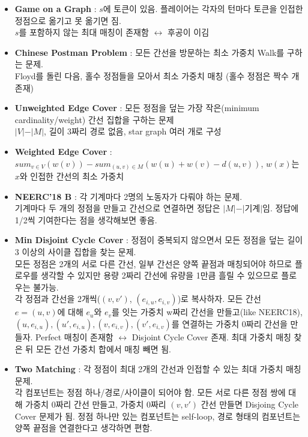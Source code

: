 \documentclass[landscape, 8pt, a4paper, oneside]{extarticle} %
\begin{document}
\begin{multicols*}{3}
\begin{itemize}
    \setlength\itemsep{0.1em}
    \item \textbf{Game on a Graph} : $s$에 토큰이 있음. 플레이어는 각자의 턴마다 토큰을 인접한 정점으로 옮기고 못 옮기면 짐.\\
    $s$를 포함하지 않는 최대 매칭이 존재함 $\leftrightarrow$ 후공이 이김
    \item \textbf{Chinese Postman Problem} : 모든 간선을 방문하는 최소 가중치 Walk를 구하는 문제.\\
    Floyd를 돌린 다음, 홀수 정점들을 모아서 최소 가중치 매칭 (홀수 정점은 짝수 개 존재)
    \item \textbf{Unweighted Edge Cover} : 모든 정점을 덮는 가장 작은(minimum cardinality/weight) 간선 집합을 구하는 문제\\
    $\vert V\vert - \vert M\vert$, 길이 3짜리 경로 없음, star graph 여러 개로 구성
    \item \textbf{Weighted Edge Cover} : $sum_{v \in V}(w(v)) - sum_{(u,v) \in M}(w(u) + w(v) - d(u,v))$, $w(x)$는 $x$와 인접한 간선의 최소 가중치
    \item \textbf{NEERC'18 B} : 각 기계마다 2명의 노동자가 다뤄야 하는 문제.\\
    기계마다 두 개의 정점을 만들고 간선으로 연결하면 정답은 $\vert M\vert - \vert\text{기계}\vert$임. 정답에 1/2씩 기여한다는 점을 생각해보면 좋음.
    \item \textbf{Min Disjoint Cycle Cover} : 정점이 중복되지 않으면서 모든 정점을 덮는 길이 3 이상의 사이클 집합을 찾는 문제.\\
    모든 정점은 2개의 서로 다른 간선, 일부 간선은 양쪽 끝점과 매칭되어야 하므로 플로우를 생각할 수 있지만 용량 2짜리 간선에 유량을 1만큼 흘릴 수 있으므로 플로우는 불가능.\\
    각 정점과 간선을 2개씩($(v, v')$, $(e_{i,u},e_{i,v})$)로 복사하자. 모든 간선 $e=(u,v)$에 대해 $e_u$와 $e_v$를 잇는 가중치 w짜리 간선을 만들고(like NEERC18), $(u,e_{i,u}), (u',e_{i,u}), (v,e_{i,v}), (v',e_{i,v})$를 연결하는 가중치 0짜리 간선을 만들자. Perfect 매칭이 존재함 $\leftrightarrow$ Disjoint Cycle Cover 존재. 최대 가중치 매칭 찾은 뒤 모든 간선 가중치 합에서 매칭 빼면 됨.
    \item \textbf{Two Matching} : 각 정점이 최대 2개의 간선과 인접할 수 있는 최대 가중치 매칭 문제.\\
    각 컴포넌트는 정점 하나/경로/사이클이 되어야 함. 모든 서로 다른 정점 쌍에 대해 가중치 0짜리 간선 만들고, 가중치 0짜리 $(v,v')$ 간선 만들면 Disjoing Cycle Cover 문제가 됨. 정점 하나만 있는 컴포넌트는 self-loop, 경로 형태의 컴포넌트는 양쪽 끝점을 연결한다고 생각하면 편함.
\end{itemize}


\end{multicols*}
\end{document}
